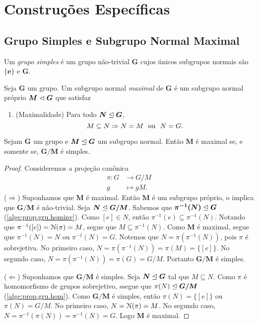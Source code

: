 \cleardoublepage
\section{Construções Específicas}

\subsection{Grupo Simples e Subgrupo Normal Maximal}

\begin{defi}
Um \emph{grupo simples} é um grupo não-trivial $\bm G$ cujos únicos subgrupos normais são $\bm{\{e\}}$ e $\bm G$.
\end{defi}

\begin{defi}
Seja $\bm G$ um grupo. Um subgrupo normal \emph{maximal} de $\bm G$ é um subgrupo normal próprio $\bm M \mathrel{\lhd} \bm G$ que satisfaz
	\begin{enumerate}
	\item (Maximalidade) Para todo $\bm N \mathrel{\unlhd} \bm G$,
		\begin{equation*}
		M \subseteq N \Rightarrow N = M \text{\ \ ou\ \ } N = G.
		\end{equation*}
	\end{enumerate}
\end{defi}

\begin{prop}
Sejam $\bm G$ um grupo e $\bm M \mathrel{\unlhd} \bm G$ um subgrupo normal. Então $\bm M$ é maximal se, e somente se, $\bm{G/M}$ é simples.
\end{prop}
\begin{proof} Consideremos a projeção canônica
	\begin{align*}
	\pi: G &\to G/M \\
		 g &\mapsto gM.
	\end{align*}
($\Rightarrow$) Suponhamos que $\bm M$ é maximal. Então $\bm M$ é um subgrupo próprio, o implica que $\bm{G/M}$ é não-trivial. Seja $\bm N \mathrel{\unlhd} \bm{G/M}$. Sabemos que $\bm{\pi^{-1}(N)} \mathrel{\unlhd} \bm G$ (\ref{alge:prop.gru.hominv}). Como $[e] \in N$, então $\pi^{-1}(e) \subseteq \pi^{-1}(N)$. Notando que $\pi^{-1}([e])=\mathcal{N}(\pi) = M$, segue que $M \subseteq \pi^{-1}(N)$. Como $\bm M$ é maximal, segue que $\pi^{-1}(N) = N$ ou $\pi^{-1}(N) = G$. Notemos que $N=\pi(\pi^{-1}(N))$, pois $\pi$ é sobrejetiva. No primeiro caso, $N = \pi(\pi^{-1}(N)) = \pi(M) = \{[e]\}$. No segundo caso, $N = \pi(\pi^{-1}(N)) = \pi(G) = G/M$. Portanto $\bm{G/M}$ é simples.

\noindent
($\Leftarrow$) Suponhamos que $\bm{G/M}$ é simples. Seja $\bm N \mathrel{\unlhd} \bm G$ tal que $M \subseteq N$. Como $\pi$ é homomorfismo de grupos sobrejetivo, ssegue que $\pi(N) \mathrel{\unlhd} \bm{G/M}$ (\ref{alge:prop.gru.hom}). Como $\bm{G/M}$ é simples, então $\pi(N) = \{[e]\}$ ou $\pi(N) = G/M$. No primeiro caso, $N = \mathcal{N}(\pi) = M$. No segundo caso, $N = \pi^{-1}(\pi(N)) = \pi^{-1}(N) = G$. Logo $\bm M$ é maximal.
\end{proof}


